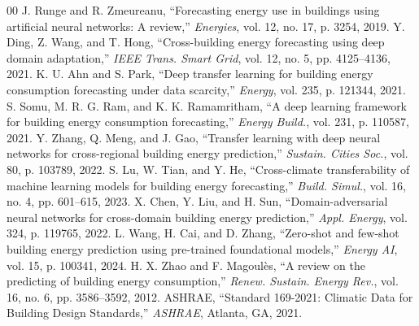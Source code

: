 \documentclass[conference]{IEEEtran}
\begin{document}
\begin{thebibliography}{00}
\newpage
{} J. Runge and R. Zmeureanu, ``Forecasting energy use in buildings using artificial neural networks: A review,'' \textit{Energies}, vol. 12, no. 17, p. 3254, 2019.
 Y. Ding, Z. Wang, and T. Hong, ``Cross-building energy forecasting using deep domain adaptation,'' \textit{IEEE Trans. Smart Grid}, vol. 12, no. 5, pp. 4125--4136, 2021.
 K. U. Ahn and S. Park, ``Deep transfer learning for building energy consumption forecasting under data scarcity,'' \textit{Energy}, vol. 235, p. 121344, 2021.
 S. Somu, M. R. G. Ram, and K. K. Ramamritham, ``A deep learning framework for building energy consumption forecasting,'' \textit{Energy Build.}, vol. 231, p. 110587, 2021.
 Y. Zhang, Q. Meng, and J. Gao, ``Transfer learning with deep neural networks for cross-regional building energy prediction,'' \textit{Sustain. Cities Soc.}, vol. 80, p. 103789, 2022.
 S. Lu, W. Tian, and Y. He, ``Cross-climate transferability of machine learning models for building energy forecasting,'' \textit{Build. Simul.}, vol. 16, no. 4, pp. 601--615, 2023.
 X. Chen, Y. Liu, and H. Sun, ``Domain-adversarial neural networks for cross-domain building energy prediction,'' \textit{Appl. Energy}, vol. 324, p. 119765, 2022.
 L. Wang, H. Cai, and D. Zhang, ``Zero-shot and few-shot building energy prediction using pre-trained foundational models,'' \textit{Energy AI}, vol. 15, p. 100341, 2024.
 H. X. Zhao and F. Magoul\`es, ``A review on the predicting of building energy consumption,'' \textit{Renew. Sustain. Energy Rev.}, vol. 16, no. 6, pp. 3586--3592, 2012.
 ASHRAE, ``Standard 169-2021: Climatic Data for Building Design Standards,'' \textit{ASHRAE}, Atlanta, GA, 2021.
\end{thebibliography}
\end{document}
